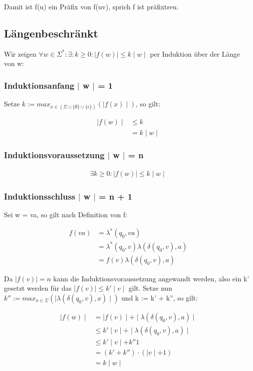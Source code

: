 \documentclass[12pt, a4paper]{article}
\begin{document}
Damit ist f(u) ein Präfix von f(uv), sprich f ist präfixtreu.

\subsection*{Längenbeschränkt}
Wir zeigen $\forall w \in \Sigma^*: \exists: k \ge 0: \mid f(w) \mid \le k \mid w \mid $ per Induktion über der Länge von w:

\subsubsection*{Induktionsanfang $\mid$ w $\mid$ = 1}
Setze $k := max_{x \in (\Sigma \cup \{ \emptyset \} \cup \{ \epsilon \})}( \mid f(x) \mid)$, so gilt:

\begin{align*}
\mid f(w) \mid &\le k \\
&= k \mid w \mid
\end{align*}

\subsubsection*{Induktionsvoraussetzung $\mid$ w $\mid$ = n}
\begin{align*}
\exists k \ge 0: \mid f(w) \mid \le k \mid w \mid
\end{align*}

\subsubsection*{Induktionsschluss $\mid$ w $\mid$ = n + 1}

Sei w = va, so gilt nach Definition von f:

\begin{align*}
f(va) &= \lambda^*(q_0, va) \\
&= \lambda^*(q_0, v) \lambda(\delta(q_0,v), a) \\
&= f(v)  \lambda(\delta(q_0,v), a)
\end{align*}

Da $\mid f(v) \mid = n$ kann die Induktionsvoraussetzung angewandt werden, also ein k' gesetzt werden für das $\mid f(v) \mid \le k' \mid v \mid$ gilt. Setze nun $k'' := max_{x \in \Sigma}(\mid \lambda(\delta(q_0,v),x) \mid )$ und k := k' + k'', so gilt:

\begin{align*}
\mid f(w) \mid &= \mid f(v) \mid + \mid \lambda(\delta(q_0,v),a) \mid \\
&\le k' \mid v \mid + \mid \lambda(\delta(q_0,v),a) \mid \\
&\le k' \mid v \mid + k'' 1 \\
&= (k' + k'') \cdot (\mid v \mid + 1) \\
&= k \mid w \mid
\end{align*}
\end{document}
